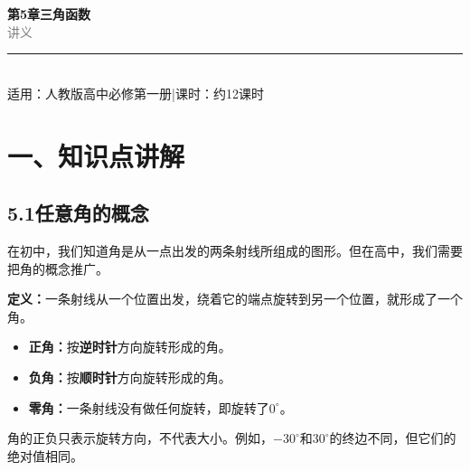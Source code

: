 \documentclass[12pt, a4paper]{ctexart}
\begin{document}
\begin{center}
{\Huge\bfseries\textcolor{mainblue}{第5章\quad 三角函数}}\\[12pt]
{\Large\textcolor{gray}{讲\quad 义}}\\[8pt]
\rule{0.6\textwidth}{1pt}\\[8pt]
{\normalsize 适用：人教版\quad 高中必修第一册\quad |\quad 课时：约12课时}
\end{center}
\vspace{10pt}

\section*{\textcolor{mainblue}{一、知识点讲解}}

\subsection*{5.1\quad 任意角的概念}

\begin{knowledgebox}[什么是"角"？]
在初中，我们知道角是从一点出发的两条射线所组成的图形。但在高中，我们需要把角的概念推广。

\medskip
\textbf{定义：}一条射线从一个位置出发，绕着它的端点旋转到另一个位置，就形成了一个角。
\begin{itemize}[leftmargin=2em]
  \item \textbf{正角：}按\textbf{逆时针}方向旋转形成的角。
  \item \textbf{负角：}按\textbf{顺时针}方向旋转形成的角。
  \item \textbf{零角：}一条射线没有做任何旋转，即旋转了$0^\circ$。
\end{itemize}
\end{knowledgebox}

\begin{tipbox}[理解要点]
角的正负只表示旋转方向，不代表大小。例如，$-30^\circ$和$30^\circ$的终边不同，但它们的绝对值相同。
\end{tipbox}
\end{document}

